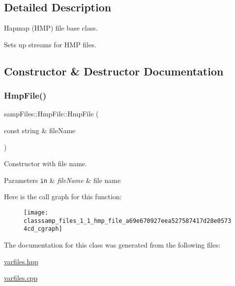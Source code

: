 \subsection{Detailed Description}
Hapmap (H\+MP) file base class. 

Sets up streams for H\+MP files. 

\subsection{Constructor \& Destructor Documentation}
\mbox{\label{classsamp_files_1_1_hmp_file_a69e670927eea527587417d28e05734cd}} 
\subsubsection{\texorpdfstring{Hmp\+File()}{HmpFile()}}
{\footnotesize\ttfamily samp\+Files\+::\+Hmp\+File\+::\+Hmp\+File (\begin{DoxyParamCaption}\item[{const string \&}]{file\+Name }\end{DoxyParamCaption})\hspace{0.3cm}{\ttfamily [inline]}}



Constructor with file name. 


\begin{DoxyParams}[1]{Parameters}
\mbox{\tt in}  & {\em file\+Name} & file name \\
\hline
\end{DoxyParams}
Here is the call graph for this function\+:\nopagebreak
\begin{figure}[H]
\begin{center}
\leavevmode
\texttt{[image: classsamp\_files\_1\_1\_hmp\_file\_a69e670927eea527587417d28e05734cd\_cgraph]}
\end{center}
\end{figure}


The documentation for this class was generated from the following files\+:\begin{DoxyCompactItemize}
\item 
\hyperlink{varfiles_8hpp}{varfiles.\+hpp}\item 
\hyperlink{varfiles_8cpp}{varfiles.\+cpp}\end{DoxyCompactItemize}
